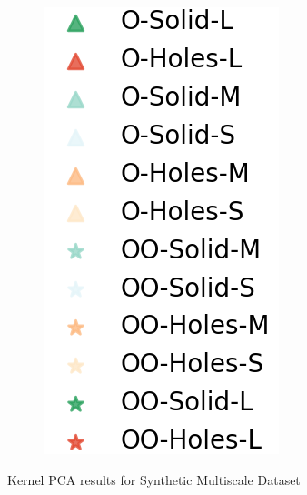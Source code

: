 \documentclass[10pt]{article}
\begin{document}
\begin{figure}[H]
\begin{subfigure}[h]{0.08\textwidth}
        \includegraphics[width=\linewidth]{ms_legend}
    \end{subfigure}%
    \caption{Kernel PCA results for Synthetic Multiscale Dataset}
\end{figure}
\end{document}
